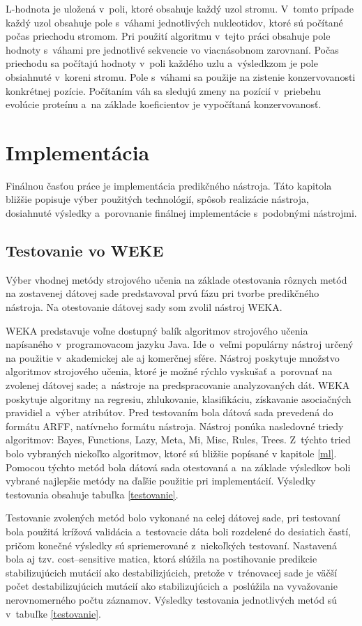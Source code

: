 L-hodnota je uložená v~poli, ktoré obsahuje každý uzol stromu. V~tomto prípade každý uzol obsahuje pole s~váhami jednotlivých nukleotidov, ktoré sú počítané počas priechodu stromom. Pri použití algoritmu v~tejto práci obsahuje pole hodnoty s~váhami pre jednotlivé sekvencie vo viacnásobnom zarovnaní. Počas priechodu sa počítajú hodnoty v~poli každého uzlu a~výsledkzom je pole obsiahnuté v~koreni stromu. Pole s~váhami sa použije na zistenie konzervovanosti konkrétnej pozície. Počítaním váh sa sledujú zmeny na pozícií v~priebehu evolúcie proteínu a~na základe koeficientov je vypočítaná konzervovanosť.

\chapter{Implementácia}
Finálnou časťou práce je implementácia predikčného nástroja. Táto kapitola bližšie popisuje výber použitých technológií, spôsob realizácie nástroja, dosiahnuté výsledky a~porovnanie finálnej implementácie s~podobnými nástrojmi.

\section{Testovanie vo WEKE}
\label{wekatest}
Výber vhodnej metódy strojového učenia na základe otestovania rôznych metód na zostavenej dátovej sade predstavoval prvú fázu pri tvorbe predikčného nástroja. Na otestovanie dátovej sady som zvolil nástroj WEKA.

WEKA \cite{weka} predstavuje voľne dostupný balík algoritmov strojového učenia napísaného v~programovacom jazyku Java. Ide o~veľmi populárny nástroj určený na použitie v~akademickej ale aj komerčnej sfére. Nástroj poskytuje množstvo algoritmov strojového učenia, ktoré je možné rýchlo vyskušať a~porovnať na zvolenej dátovej sade; a~nástroje na predspracovanie analyzovaných dát. WEKA poskytuje algoritmy na regresiu, zhlukovanie, klasifikáciu, získavanie asociačných pravidiel a~výber atribútov.
Pred testovaním bola dátová sada prevedená do formátu ARFF, natívneho formátu nástroja. Nástroj ponúka nasledovné triedy algoritmov: Bayes, Functions, Lazy, Meta, Mi, Misc, Rules, Trees. Z~týchto tried bolo vybraných niekoľko algoritmov, ktoré sú bližšie popísané v kapitole \ref{ml}. Pomocou týchto metód bola dátová sada otestovaná a~na základe výsledkov boli vybrané najlepšie metódy na ďaľšie použitie pri implementácií. Výsledky testovania obsahuje tabuľka \ref{testovanie}.

Testovanie zvolených metód bolo vykonané na celej dátovej sade, pri testovaní bola použitá krížová validácia a~testovacie dáta boli rozdelené do desiatich častí, pričom konečné výsledky sú spriemerované z~niekoľkých testovaní. Nastavená bola aj tzv. cost--sensitive matica, ktorá slúžila na postihovanie predikcie stabilizujúcich mutácií ako destabilizjúcich, pretože v~trénovacej sade je väčší počet destabilizujúcich mutácií ako stabilizujúcich a~poslúžila na vyvažovanie nerovnomerného počtu záznamov. Výsledky testovania jednotlivých metód sú v~tabuľke \ref{testovanie}. 

